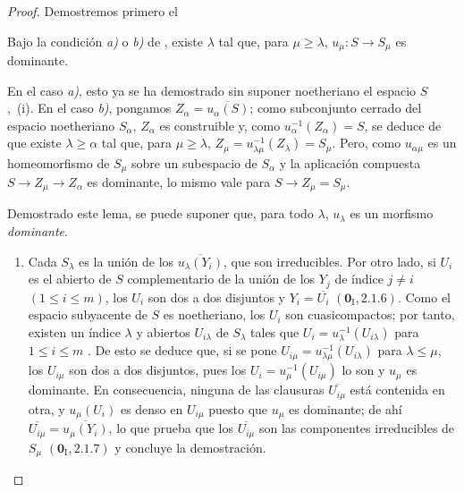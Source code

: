 \begin{proof}
Demostremos primero el

\begin{lemma}[8.4.2.1]
\label{IV.8.4.2.1-fr}
Bajo la condición \emph{a)} o \emph{b)} de , existe $\lambda$ tal que, para $\mu\geq\lambda$, $u_\mu:S\to S_\mu$ es dominante.
\end{lemma}

En el caso \emph{a)}, esto ya se ha demostrado sin suponer noetheriano el espacio $S$ ,~(i).
En el caso \emph{b)}, pongamos $Z_\alpha=\overline{u_\alpha(S)}$; como subconjunto cerrado del espacio noetheriano $S_\alpha$, $Z_\alpha$ es construible y, como $u_\alpha^{-1}(Z_\alpha)=S$, se deduce de  que existe $\lambda\geq\alpha$ tal que, para $\mu\geq\lambda$, $Z_\mu=u_{\lambda\mu}^{-1}(Z_\lambda)=S_\mu$.
Pero, como $u_{\alpha\mu}$ es un homeomorfismo de $S_\mu$ sobre un subespacio de $S_\alpha$ y la aplicación compuesta $S\to Z_\mu\to Z_\alpha$ es dominante, lo mismo vale para $S\to Z_\mu=S_\mu$.

Demostrado este lema, se puede suponer que, para todo $\lambda$, $u_\lambda$ es un morfismo \emph{dominante}.
\begin{enumerate}[label=(\roman*)]
  \item Cada $S_\lambda$ es la unión de los $\overline{u_\lambda(Y_i)}$, que son irreducibles.
Por otro lado, si $U_i$ es el abierto de $S$ complementario de la unión de los $Y_j$ de índice $j\neq i$ $(1\leq i\leq m)$, los $U_i$ son dos a dos disjuntos y $Y_i=\overline{U_i}$ $(\mathbf{0}_{\mathrm I},2.1.6)$.
Como el espacio subyacente de $S$ es noetheriano, los $U_i$ son cuasicompactos; por tanto, existen un índice $\lambda$ y abiertos $U_{i\lambda}$ de $S_\lambda$ tales que $U_i=u_\lambda^{-1}(U_{i\lambda})$ para $1\leq i\leq m$ .
De esto se deduce que, si se pone $U_{i\mu}=u_{\lambda\mu}^{-1}(U_{i\lambda})$ para $\lambda\leq\mu$, los $U_{i\mu}$ son dos a dos disjuntos, pues los $U_i=u_\mu^{-1}(U_{i\mu})$ lo son y $u_\mu$ es dominante.
En consecuencia, ninguna de las clausuras $\overline{U_{i\mu}}$ está contenida en otra, y $u_\mu(U_i)$ es denso en $U_{i\mu}$ puesto que $u_\mu$ es dominante; de ahí $\overline{U_{i\mu}}=\overline{u_\mu(Y_i)}$, lo que prueba que los $\overline{U_{i\mu}}$ son las componentes irreducibles de $S_\mu$ $(\mathbf{0}_{\mathrm I},2.1.7)$ y concluye la demostración.


\end{enumerate}
\end{proof}
